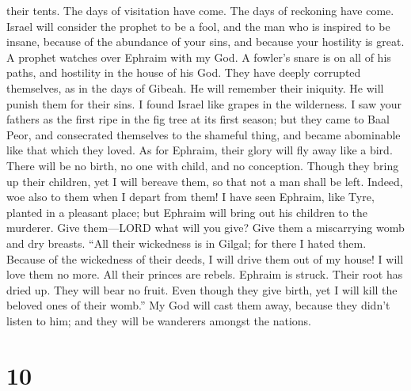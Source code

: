 their tents.  The days of visitation have come. The days
of reckoning have come. Israel will consider the prophet to be a fool,
and the man who is inspired to be insane, because of the abundance of
your sins, and because your hostility is great.  A prophet
watches over Ephraim with my God. A fowler's snare is on all of his
paths, and hostility in the house of his God.  They have
deeply corrupted themselves, as in the days of Gibeah. He will remember
their iniquity. He will punish them for their sins.  I
found Israel like grapes in the wilderness. I saw your fathers as the
first ripe in the fig tree at its first season; but they came to Baal
Peor, and consecrated themselves to the shameful thing, and became
abominable like that which they loved.  As for Ephraim,
their glory will fly away like a bird. There will be no birth, no one
with child, and no conception.  Though they bring up
their children, yet I will bereave them, so that not a man shall be
left. Indeed, woe also to them when I depart from them! 
I have seen Ephraim, like Tyre, planted in a pleasant place; but Ephraim
will bring out his children to the murderer.  Give
them---LORD what will you give? Give them a miscarrying womb and dry
breasts.  ``All their wickedness is in Gilgal; for there
I hated them. Because of the wickedness of their deeds, I will drive
them out of my house! I will love them no more. All their princes are
rebels.  Ephraim is struck. Their root has dried up. They
will bear no fruit. Even though they give birth, yet I will kill the
beloved ones of their womb.''  My God will cast them
away, because they didn't listen to him; and they will be wanderers
amongst the nations.

\hypertarget{section-5}{%
\section{10}\label{section-5}}

